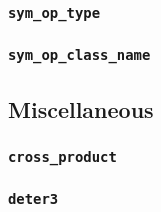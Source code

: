 \subsubsection{{\tt sym\_op\_type}}

\subsubsection{{\tt sym\_op\_class\_name}}

\subsection{Miscellaneous}

\subsubsection{{\tt cross\_product}}

\subsubsection{{\tt deter3}}


